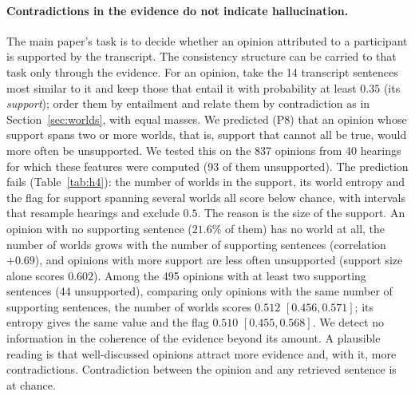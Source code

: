 \documentclass[english]{desafiokunumi}
\theoremstyle{definition}
\theoremstyle{remark}
\begin{document}
\paragraph{Contradictions in the evidence do not indicate hallucination.} The
main paper's task is to decide whether an opinion attributed to a participant
is supported by the transcript. The consistency structure can be carried to
that task only through the evidence. For an opinion, take the 14 transcript
sentences most similar to it and keep those that entail it with probability at
least $0.35$ (its \emph{support}); order them by entailment and relate them by
contradiction as in Section~\ref{sec:worlds}, with equal masses. We predicted
(P8) that an opinion whose support spans two or more worlds, that is, support
that cannot all be true, would more often be unsupported. We tested this on the
837 opinions from 40 hearings for which these features were computed (93 of
them unsupported). The prediction fails (Table~\ref{tab:h4}): the number of
worlds in the support, its world entropy and the flag for support spanning
several worlds all score below chance, with intervals that resample hearings
and exclude $0.5$. The reason is the size of the support. An opinion with no
supporting sentence ($21.6\%$ of them) has no world at all, the number of
worlds grows with the number of supporting sentences (correlation $+0.69$),
and opinions with more support are less often unsupported (support size alone
scores $0.602$). Among the 495 opinions with at least two supporting
sentences (44 unsupported), comparing only opinions with the same number of
supporting sentences, the number of worlds scores $0.512$ $[0.456, 0.571]$;
its entropy gives the same value and the flag $0.510$ $[0.455, 0.568]$. We
detect no information in the coherence of the evidence beyond its amount. A
plausible reading is that well-discussed opinions attract more evidence and,
with it, more contradictions. Contradiction between the opinion
and any retrieved sentence is at chance.
\end{document}
